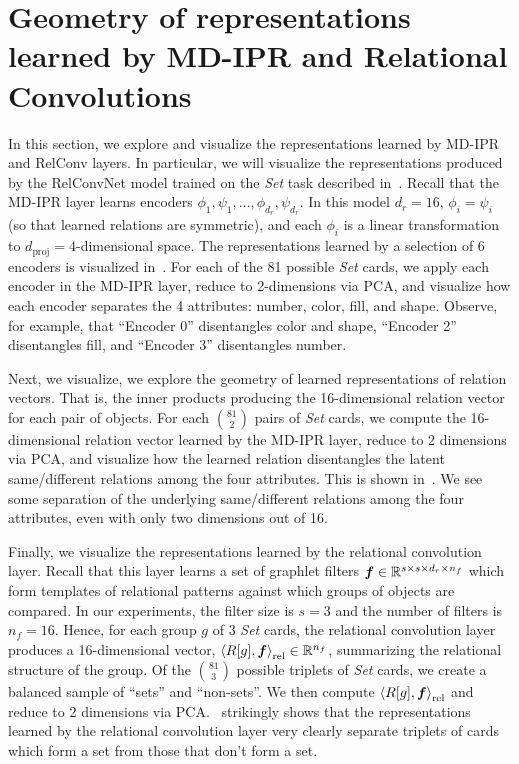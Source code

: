 \section{Geometry of representations learned by MD-IPR and Relational Convolutions}\label{sec:appendix_rep_analysis}

In this section, we explore and visualize the representations learned by MD-IPR and RelConv layers. In particular, we will visualize the representations produced by the RelConvNet model trained on the \textit{Set} task described in~. Recall that the MD-IPR layer learns encoders $\phi_1, \psi_1, \ldots, \phi_{d_r}, \psi_{d_r}$. In this model $d_r = 16$, $\phi_i = \psi_i$ (so that learned relations are symmetric), and each $\phi_i$ is a linear transformation to $d_{\mathrm{proj}} = 4$-dimensional space. The representations learned by a selection of 6 encoders is visualized in~. For each of the 81 possible \textit{Set} cards, we apply each encoder in the MD-IPR layer, reduce to 2-dimensions via PCA, and visualize how each encoder separates the 4 attributes: number, color, fill, and shape. Observe, for example, that ``Encoder 0'' disentangles color and shape, ``Encoder 2'' disentangles fill, and ``Encoder 3'' disentangles number.

Next, we visualize, we explore the geometry of learned representations of relation vectors. That is, the inner products producing the 16-dimensional relation vector for each pair of objects. For each $\binom{81}{2}$ pairs of \textit{Set} cards, we compute the 16-dimensional relation vector learned by the MD-IPR layer, reduce to 2 dimensions via PCA, and visualize how the learned relation disentangles the latent same/different relations among the four attributes. This is shown in~. We see some separation of the underlying same/different relations among the four attributes, even with only two dimensions out of 16.

Finally, we visualize the representations learned by the relational convolution layer. Recall that this layer learns a set of graphlet filters $\bm{f} \in \mathbb{R}^{s \times s \times d_r \times n_f}$ which form templates of relational patterns against which groups of objects are compared. In our experiments, the filter size is $s = 3$ and the number of filters is $n_f = 16$. Hence, for each group $g$ of 3 \textit{Set} cards, the relational convolution layer produces a 16-dimensional vector, $\left\langle R[g], \bm{f} \right\rangle_\mathrm{rel} \in \mathbb{R}^{n_f}$, summarizing the relational structure of the group. Of the $\binom{81}{3}$ possible triplets of \textit{Set} cards, we create a balanced sample of ``sets'' and ``non-sets''. We then compute $\left\langle R[g], \bm{f} \right\rangle_\mathrm{rel}$ and reduce to 2 dimensions via PCA.~ strikingly shows that the representations learned by the relational convolution layer very clearly separate triplets of cards which form a set from those that don't form a set.


